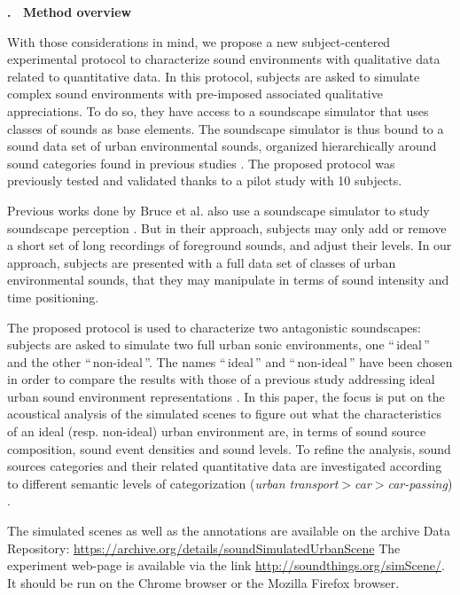 \documentclass[12pt, titlepage, reqno]{article} %
\renewcommand{\section}[1]{\medskip \addtocounter{section}{1}\raggedright 
     \textbf{\Roman{section}. \ #1}\medskip \setcounter{subsection}{0}
    \setlength{\parindent}{5ex}
 }
\begin{document}
\section{Method overview}

With those considerations in mind, we propose a new  subject-centered experimental protocol to characterize sound environments with qualitative data related to quantitative data. In this protocol, subjects are asked to simulate complex sound environments with pre-imposed associated qualitative appreciations. To do so, they have access to a soundscape simulator that uses classes of sounds as base elements. The soundscape simulator is thus bound to a sound data set of urban environmental sounds, organized hierarchically around sound categories found in previous studies \cite{maffiolo_caracterisation_1999,dubois2006cognitive, guastavino_categorization_2007, guastavino_ideal_2006, niessen_categories_2010, brown_towards_2011}. The proposed protocol was previously tested and validated thanks to a pilot study\cite{soundscape3} with 10 subjects.

Previous works done by Bruce et al. also use a soundscape simulator to study soundscape perception \cite{bruce2009development,bruce2014effects}. But in their approach, subjects may only add or remove a short set of long recordings of foreground sounds, and adjust their levels. In our approach, subjects are presented with a full data set of classes of urban environmental sounds, that they may manipulate in terms of sound intensity and time positioning.

The proposed protocol is used to characterize two antagonistic soundscapes: subjects are asked to simulate two full urban sonic environments, one ``\,ideal\,'' and the other ``\,non-ideal\,''. The names ``\,ideal\,'' and ``\,non-ideal\,'' have been chosen in order to compare the results with those of a previous study addressing ideal urban sound environment representations \cite{guastavino_ideal_2006}. In this paper, the focus is put  on the acoustical analysis of the simulated scenes to figure out what the characteristics of an ideal (resp. non-ideal) urban environment are, in terms of sound source composition, sound event densities and sound levels. To refine the analysis, sound sources categories and their related quantitative data are investigated according to different semantic levels of categorization (\textit{urban transport}$>$\textit{car}$>$\textit{car-passing}) \cite{niessen_categories_2010, brown_towards_2011}.

The simulated scenes as well as the annotations are available on the archive Data Repository: \url{https://archive.org/details/soundSimulatedUrbanScene}
The experiment web-page is available via the link \url{http://soundthings.org/simScene/}. It should be run on the Chrome browser or the Mozilla Firefox browser.
\end{document}
